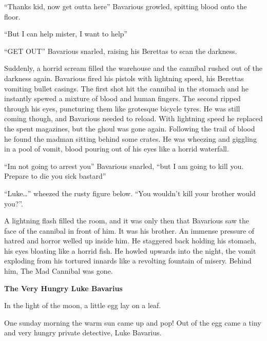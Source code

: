 ``Thanks kid, now get outta here'' Bavarious growled,
spitting blood onto the floor.

``But I can help mister, I want to help''

``GET OUT'' Bavarious snarled, raising his Berettas to
scan the darkness.



Suddenly, a horrid scream filled the warehouse and the cannibal
rushed out of the darkness again. Bavarious fired his pistols with
lightning speed, his Berettas vomiting bullet casings. The first
shot hit the cannibal in the stomach and he instantly spewed a
mixture of blood and human fingers. The second ripped through his
eyes, puncturing them like grotesque bicycle tyres. He was still
coming though, and Bavarious needed to reload. With lightning speed
he replaced the spent magazines, but the ghoul was gone again.
Following the trail of blood he found the madman sitting behind
some crates. He was wheezing and giggling in a pool of vomit, blood
pouring out of his eyes like a horrid waterfall.



``Im not going to arrest you'' Bavarious snarled,
``but I am going to kill you. Prepare to die you sick
bastard''



``Luke{\ldots}'' wheezed the rusty figure below.
``You wouldn't kill your brother would
you?''.



A lightning flash filled the room, and it was only then that
Bavarious saw the face of the cannibal in front of him. It was his
brother. An immense pressure of hatred and horror welled up inside
him. He staggered back holding his stomach, his eyes bloating like
a horrid fish. He howled upwards into the night, the vomit
exploding from his tortured innards like a revolting fountain of
misery. Behind him, The Mad Cannibal was gone.








{\bf The Very Hungry Luke Bavarius}



In the light of the moon, a little egg lay on a leaf.



One sunday morning the warm sun came up and pop! Out of the egg
came a tiny and very hungry private detective, Luke Bavarius.



